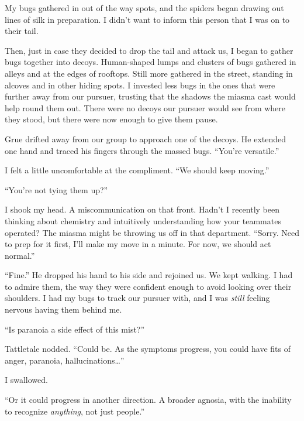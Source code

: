 My bugs gathered in out of the way spots, and the spiders began drawing out lines of silk in preparation.  I didn't want to inform this person that I was on to their tail.



Then, just in case they decided to drop the tail and attack us, I began to gather bugs together into decoys.  Human-shaped lumps and clusters of bugs gathered in alleys and at the edges of rooftops.  Still more gathered in the street, standing in alcoves and in other hiding spots.  I invested less bugs in the ones that were further away from our pursuer, trusting that the shadows the miasma cast would help round them out.  There were no decoys our pursuer would see from where they stood, but there were now enough to give them pause.



Grue drifted away from our group to approach one of the decoys.  He extended one hand and traced his fingers through the massed bugs.  ``You're versatile.''



I felt a little uncomfortable at the compliment.  ``We should keep moving.''



``You're not tying them up?''



I shook my head.  A miscommunication on that front.  Hadn't I recently been thinking about chemistry and intuitively understanding how your teammates operated?  The miasma might be throwing us off in that department.  ``Sorry.  Need to prep for it first, I'll make my move in a minute.  For now, we should act normal.''



``Fine.''  He dropped his hand to his side and rejoined us.  We kept walking.  I had to admire them, the way they were confident enough to avoid looking over their shoulders.  I had my bugs to track our pursuer with, and I was \emph{still} feeling nervous having them behind me.



``Is paranoia a side effect of this mist?''



Tattletale nodded.  ``Could be.  As the symptoms progress, you could have fits of anger, paranoia, hallucinations\ldots''



I swallowed.



``Or it could progress in another direction.  A broader agnosia, with the inability to recognize \emph{anything}, not just people.''



